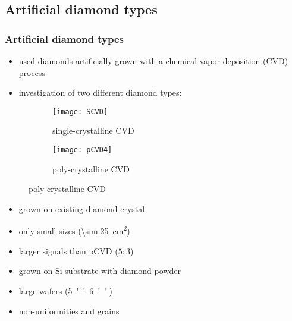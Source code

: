 \subsection{Artificial diamond types}
\begin{frame}
	\frametitle{Artificial diamond types}
	\begin{itemize}
		\item used diamonds artificially grown with a chemical vapor deposition (CVD) process
		\item investigation of two different diamond types:
	\end{itemize}
	\begin{figure}[htbp] 
		\begin{center}
			\begin{subfigure}{0.45\textwidth}  
				\centering 
				\texttt{[image: SCVD]}
				\caption{single-crystalline CVD}
			\end{subfigure}
			\begin{subfigure}{0.45\textwidth} 
				\centering 
				\texttt{[image: pCVD4]}
				\caption{poly-crystalline CVD} 	
			\end{subfigure} 
		\end{center}
	\end{figure}
	\begin{minipage}{5.5cm}
		\begin{itemize}
			\item grown on existing diamond crystal
			\item only small sizes (\SI{\sim.25}{cm^2})
			\item larger signals than pCVD ($5:3$)
		\end{itemize}
	\end{minipage}
	\hspace*{.5cm}
	\begin{minipage}{5cm}
		\begin{itemize}
			\item grown on Si substrate with diamond powder
			\item large wafers (\SIrange{5}{6}{''} \diameter)
			\item non-uniformities and grains
		\end{itemize}
	\end{minipage}
\end{frame}

